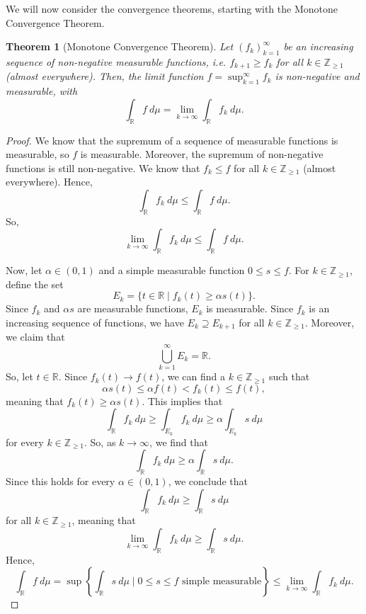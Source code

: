 \documentclass[a4paper, openany]{memoir}
\theoremstyle{definition}
\theoremstyle{plain}
\newtheorem{theorem}[definition]{Theorem}
\begin{document}
    We will now consider the convergence theorems, starting with the Monotone Convergence Theorem.
    \begin{theorem}[Monotone Convergence Theorem]
        Let $(f_k)_{k=1}^\infty$ be an increasing sequence of non-negative measurable functions, i.e. $f_{k+1} \geq f_k$ for all $k \in \mathbb{Z}_{\geq 1}$ (almost everywhere). Then, the limit function $f = \sup_{k=1}^\infty f_k$ is non-negative and measurable, with
        \[\int_{\mathbb{R}} f \ d\mu = \lim_{k \to \infty} \int_{\mathbb{R}} f_k \ d\mu.\]
    \end{theorem}
    \begin{proof}
        We know that the supremum of a sequence of measurable functions is measurable, so $f$ is measurable. Moreover, the supremum of non-negative functions is still non-negative. We know that $f_k \leq f$ for all $k \in \mathbb{Z}_{\geq 1}$ (almost everywhere). Hence,
        \[\int_{\mathbb{R}} f_k \ d\mu \leq \int_{\mathbb{R}} f \ d\mu.\]
        So,
        \[\lim_{k \to \infty} \int_{\mathbb{R}} f_k \ d\mu \leq \int_{\mathbb{R}} f \ d\mu.\]

        Now, let $\alpha \in (0, 1)$ and a simple measurable function $0 \leq s \leq f$. For $k \in \mathbb{Z}_{\geq 1}$, define the set
        \[E_k = \{t \in \mathbb{R} \mid f_k(t) \geq \alpha s(t)\}.\]
        Since $f_k$ and $\alpha s$ are measurable functions, $E_k$ is measurable. Since $f_k$ is an increasing sequence of functions, we have $E_k \supseteq E_{k+1}$ for all $k \in \mathbb{Z}_{\geq 1}$. Moreover, we claim that
        \[\bigcup_{k=1}^\infty E_k = \mathbb{R}.\]
        So, let $t \in \mathbb{R}$. Since $f_k(t) \to f(t)$, we can find a $k \in \mathbb{Z}_{\geq 1}$ such that 
        \[\alpha s(t) \leq \alpha f(t) < f_k(t) \leq f(t),\]
        meaning that $f_k(t) \geq \alpha s(t)$. This implies that
        \[\int_{\mathbb{R}} f_k \ d\mu \geq \int_{E_k} f_k \ d\mu \geq \alpha \int_{E_k} s \ d\mu\]
        for every $k \in \mathbb{Z}_{\geq 1}$. So, as $k \to \infty$, we find that
        \[\int_{\mathbb{R}} f_k \ d\mu \geq \alpha \int_{\mathbb{R}} s \ d\mu.\]
        Since this holds for every $\alpha \in (0, 1)$, we conclude that
        \[\int_{\mathbb{R}} f_k \ d\mu \geq \int_{\mathbb{R}} s \ d\mu\]
        for all $k \in \mathbb{Z}_{\geq 1}$, meaning that
        \[\lim_{k \to \infty} \int_{\mathbb{R}} f_k \ d\mu \geq \int_{\mathbb{R}} s \ d\mu.\]
        Hence,
        \[\int_{\mathbb{R}} f \ d\mu = \sup \left\{\int_{\mathbb{R}} s \ d\mu \mid 0 \leq s \leq f \textrm{ simple measurable}\right\} \leq \lim_{k \to \infty} \int_{\mathbb{R}} f_k \ d\mu.\]
    \end{proof}
\end{document}
